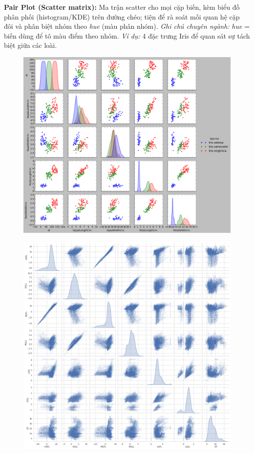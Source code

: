 \documentclass[11pt]{article}
\begin{document}
\medskip
\textbf{Pair Plot (Scatter matrix):} Ma trận scatter cho mọi cặp biến, kèm biểu đồ phân phối (histogram/KDE) trên đường chéo; tiện để rà soát mối quan hệ cặp đôi và phân biệt nhóm theo \emph{hue} (màu phân nhóm).
\textit{Ghi chú chuyên ngành:} \emph{hue} = biến dùng để tô màu điểm theo nhóm.
\textit{Ví dụ:} 4 đặc trưng Iris để quan sát sự tách biệt giữa các loài.
\begin{figure}[H]
    \centering
    \includegraphics[width=0.7\linewidth]{images/PairP_Iris.png}
\end{figure}
\begin{figure}[H]
    \centering
    \includegraphics[width=0.7\linewidth]{images/PairPlot_dots.png}
\end{figure}
\end{document}
